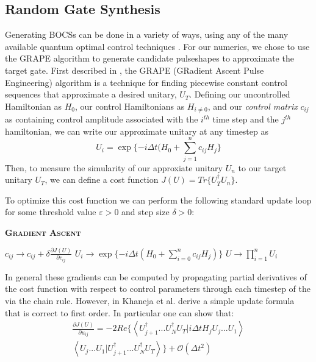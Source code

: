 \documentclass[aps,nofootinbib,pra,notitlepage,twocolumn]{revtex4-1}
\newcommand{\braket}[2]{\left\langle #1 | #2 \right\rangle}
\begin{document}
\subsection{Random Gate Synthesis}
Generating BOCSs can be done in a variety of ways, using any  of the many available quantum optimal control techniques \cite{Khaneja2005, Caneva2011, Machnes2018}. For our numerics, we chose to use the GRAPE algorithm to generate candidate pulseshapes to approximate the target gate. First described in \cite{Khaneja2005}, the GRAPE (GRadient Ascent Pulse Engineering) algorithm is a technique for finding piecewise constant control sequences that approximate a desired unitary, $U_T$. Defining our uncontrolled Hamiltonian as $H_0$, our control Hamiltonians as $H_{i\neq 0}$, and our \textit{control matrix} $c_{ij}$ as containing control amplitude associated with the $i^{th}$ time step and the $j^{th}$ hamiltonian, we can write our approximate unitary at any timestep as
\begin{equation}\label{eq:3}
  U_i = \exp\{-i\Delta t(H_0 + \sum_{j=1}^{n}c_{ij}H_{j}\}
\end{equation}
Then, to measure the simularity of our approxiate unitary $U_n$ to our target unitary $U_T$, we can define a cost function $J(U) = Tr\{U_T^{\dagger}U_n\}$.

To optimize this cost function we can perform the following standard update loop for some threshold value $\varepsilon > 0$ and step size $\delta > 0$:
\begin{algorithm}[H]
  \caption{\textsc{\textbf{Gradient Ascent}}}
  \begin{algorithmic}
    \State $c_{ij} \rightarrow c_{ij} + \delta\frac{\partial J(U)}{\partial c_{ij}}$
    \State $U_i \rightarrow \exp\{-i\Delta t(H_0 + \sum_{i=0}^{n}c_{ij}H_j)\}$
    \EndFor
    \State $U \rightarrow \prod_{i=1}^nU_i$
    \EndWhile
  \end{algorithmic}
\end{algorithm}

In general these gradients can be computed by propagating partial derivatives of the cost function with respect to control parameters through each timestep of the  via the chain rule. However, in \cite{Khaneja2005} Khaneja et al. derive a simple update formula that is correct to first order. In particular one can show that:
\begin{equation}\label{eq:update}
  \begin{split}
\frac{\partial J(U)}{\partial u_{ij}} = -2Re\{\braket{{U_{j+1}^{\dagger}...U_N^{\dagger} U_T}}{i\Delta tH_jU_j...U_1}\\
\braket{U_j...U_1}{U_{j+1}^{\dagger}...U_N^{\dagger} U_T}\} +  \mathcal{O}(\Delta t^2)
  \end{split}
\end{equation}
\end{document}
